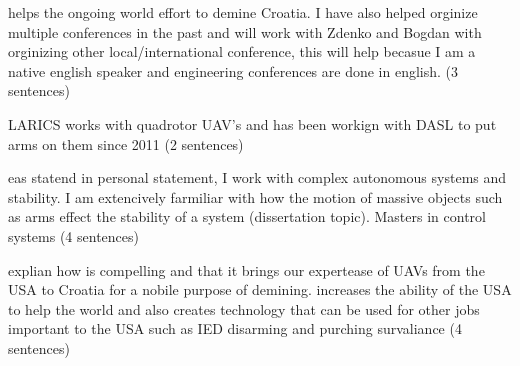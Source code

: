 \documentclass[12pt]{article}
\begin{document}
helps the ongoing world effort to demine Croatia.  I have also helped orginize multiple conferences in 
the past and will work with Zdenko and Bogdan with orginizing other local/international conference, 
this will help becasue I am a native english speaker and engineering conferences are done in english. 
(3 sentences)

LARICS works with quadrotor UAV's and has been workign with DASL to put arms on them since 2011 
(2 sentences)

eas statend in personal statement, I work with complex autonomous systems and stability.  I am 
extencively farmiliar with how the motion of massive objects such as arms effect the stability of a system 
(dissertation topic).  Masters in control systems  (4 sentences)


explian how is compelling and that it brings our expertease of UAVs from the USA to Croatia for a 
nobile purpose of demining.  increases the ability of the USA to help the world and also creates 
technology that can be used for other jobs important to the USA such as IED disarming and purching 
survaliance (4 sentences)
\end{document}
